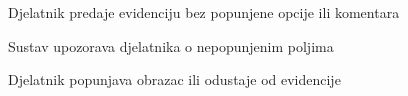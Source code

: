 \begin{packed_item}
\begin{packed_item}
\begin{packed_enum}
						\end{packed_enum}
						\item[7.a] Djelatnik predaje evidenciju bez popunjene opcije ili komentara
						\item[] \begin{packed_enum}
							\item Sustav upozorava djelatnika o nepopunjenim poljima
							\item Djelatnik popunjava obrazac ili odustaje od evidencije
							
						\end{packed_enum}
					\end{packed_item}
				\end{packed_item}
				
					
				
				\noindent {}
